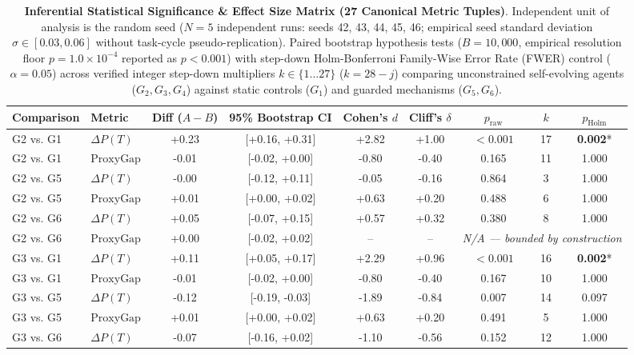 \begin{table}[t]
\centering
\small
\caption{\textbf{Inferential Statistical Significance & Effect Size Matrix (27 Canonical Metric Tuples)}. Independent unit of analysis is the random seed ($N = 5$ independent runs: seeds 42, 43, 44, 45, 46; empirical seed standard deviation $\sigma \in [0.03, 0.06]$ without task-cycle pseudo-replication). Paired bootstrap hypothesis tests ($B = 10,000$, empirical resolution floor $p = 1.0 \times 10^{-4}$ reported as $p < 0.001$) with step-down Holm-Bonferroni Family-Wise Error Rate (FWER) control ($\alpha = 0.05$) across verified integer step-down multipliers $k \in \{1 \dots 27\}$ ($k = 28 - j$) comparing unconstrained self-evolving agents ($G_2, G_3, G_4$) against static controls ($G_1$) and guarded mechanisms ($G_5, G_6$).}
\label{tab:significance_testing}
\begin{tabular}{llccccccc}
\toprule
\textbf{Comparison} & \textbf{Metric} & \textbf{Diff ($A - B$)} & \textbf{95\% Bootstrap CI} & \textbf{Cohen's $d$} & \textbf{Cliff's $\delta$} & \textbf{$p_{\text{raw}}$} & \textbf{$k$} & \textbf{$p_{\text{Holm}}$} \\
\midrule
G2 vs. G1 & $\Delta P(T)$ & +0.23 & [+0.16, +0.31] & +2.82 & +1.00 & $<0.001$ & 17 & \textbf{0.002}* \\
G2 vs. G1 & $\text{ProxyGap}$ & -0.01 & [-0.02, +0.00] & -0.80 & -0.40 & 0.165 & 11 & 1.000 \\
G2 vs. G5 & $\Delta P(T)$ & -0.00 & [-0.12, +0.11] & -0.05 & -0.16 & 0.864 & 3 & 1.000 \\
G2 vs. G5 & $\text{ProxyGap}$ & +0.01 & [+0.00, +0.02] & +0.63 & +0.20 & 0.488 & 6 & 1.000 \\
G2 vs. G6 & $\Delta P(T)$ & +0.05 & [-0.07, +0.15] & +0.57 & +0.32 & 0.380 & 8 & 1.000 \\
G2 vs. G6 & $\text{ProxyGap}$ & +0.00 & [-0.02, +0.02] & -- & -- & \multicolumn{3}{c}{\textit{N/A --- bounded by construction}} \\
G3 vs. G1 & $\Delta P(T)$ & +0.11 & [+0.05, +0.17] & +2.29 & +0.96 & $<0.001$ & 16 & \textbf{0.002}* \\
G3 vs. G1 & $\text{ProxyGap}$ & -0.01 & [-0.02, +0.00] & -0.80 & -0.40 & 0.167 & 10 & 1.000 \\
G3 vs. G5 & $\Delta P(T)$ & -0.12 & [-0.19, -0.03] & -1.89 & -0.84 & 0.007 & 14 & 0.097 \\
G3 vs. G5 & $\text{ProxyGap}$ & +0.01 & [+0.00, +0.02] & +0.63 & +0.20 & 0.491 & 5 & 1.000 \\
G3 vs. G6 & $\Delta P(T)$ & -0.07 & [-0.16, +0.02] & -1.10 & -0.56 & 0.152 & 12 & 1.000 \\

\end{tabular}
\end{table}
